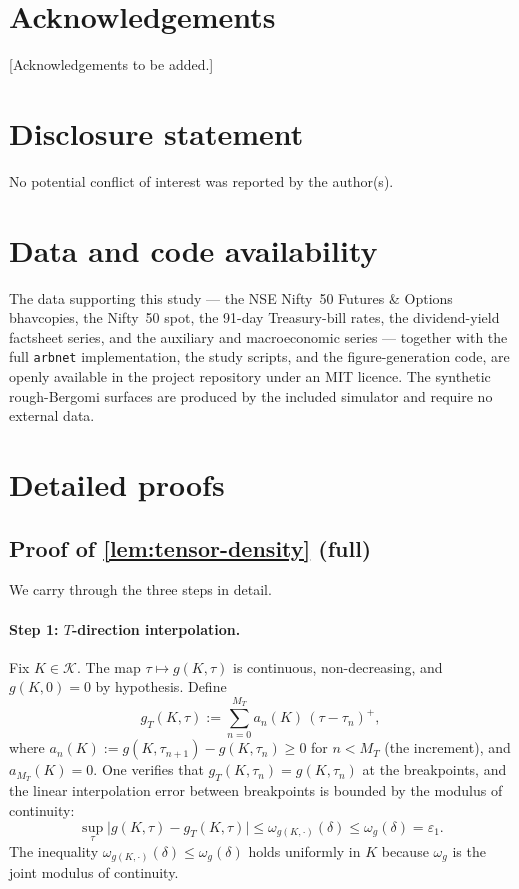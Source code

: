 \documentclass[largeformat]{interact}
\theoremstyle{plain}
\theoremstyle{definition}
\newcommand{\eps}{\varepsilon}
\newcommand{\eqdef}{:=}
\begin{document}
\section*{Acknowledgements}

[Acknowledgements to be added.]

\section*{Disclosure statement}

No potential conflict of interest was reported by the author(s).

\section*{Data and code availability}

The data supporting this study --- the NSE Nifty~50 Futures \& Options bhavcopies, the Nifty~50 spot, the 91-day Treasury-bill rates, the dividend-yield factsheet series, and the auxiliary and macroeconomic series --- together with the full \texttt{arbnet} implementation, the study scripts, and the figure-generation code, are openly available in the project repository under an MIT licence. The synthetic rough-Bergomi surfaces are produced by the included simulator and require no external data.

\appendix
\section{Detailed proofs}
\label{app:proofs}

\subsection{Proof of \cref{lem:tensor-density} (full)}
\label{app:tensor-density-proof}

We carry through the three steps in detail.

\paragraph{Step 1: $T$-direction interpolation.}
Fix $K \in \mathcal{K}$. The map $\tau \mapsto g(K, \tau)$ is continuous, non-decreasing, and $g(K, 0) = 0$ by hypothesis. Define
\[
g_T(K, \tau) \eqdef \sum_{n=0}^{M_T} a_n(K)\,(\tau - \tau_n)^+,
\]
where $a_n(K) \eqdef g(K, \tau_{n+1}) - g(K, \tau_n) \geq 0$ for $n < M_T$ (the increment), and $a_{M_T}(K) = 0$. One verifies that $g_T(K, \tau_n) = g(K, \tau_n)$ at the breakpoints, and the linear interpolation error between breakpoints is bounded by the modulus of continuity:
\[
\sup_\tau \bigl|g(K, \tau) - g_T(K, \tau)\bigr| \leq \omega_{g(K, \cdot)}(\delta) \leq \omega_g(\delta) = \eps_1.
\]
The inequality $\omega_{g(K, \cdot)}(\delta) \leq \omega_g(\delta)$ holds uniformly in $K$ because $\omega_g$ is the joint modulus of continuity.
\end{document}
